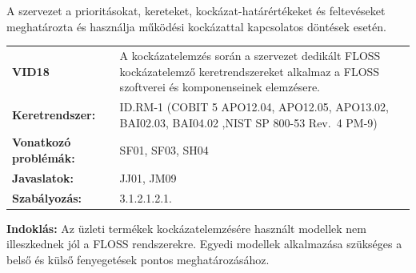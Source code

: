\documentclass[12pt,magyar,a4paper,oneside]{scrreprt}
\begin{document}
A szervezet a prioritásokat, kereteket, kockázat-határértékeket és
feltevéseket meghatározta és használja működési kockázattal kapcsolatos
döntések esetén.

\begin{longtable}[]{@{}ll@{}}
\toprule
\endhead
\begin{minipage}[t]{0.16\columnwidth}\raggedright
\textbf{VID18}\strut
\end{minipage} & \begin{minipage}[t]{0.79\columnwidth}\raggedright
A kockázatelemzés során a szervezet dedikált FLOSS kockázatelemző
keretrendszereket alkalmaz a FLOSS szoftverei és komponenseinek
elemzésere.\strut
\end{minipage}\tabularnewline
\begin{minipage}[t]{0.16\columnwidth}\raggedright
\textbf{Keretrendszer:}\strut
\end{minipage} & \begin{minipage}[t]{0.79\columnwidth}\raggedright
ID.RM-1 (COBIT 5 APO12.04, APO12.05, APO13.02, BAI02.03, BAI04.02 ,NIST
SP 800-53 Rev.~4 PM-9)\strut
\end{minipage}\tabularnewline
\begin{minipage}[t]{0.16\columnwidth}\raggedright
\textbf{Vonatkozó problémák:}\strut
\end{minipage} & \begin{minipage}[t]{0.79\columnwidth}\raggedright
SF01, SF03, SH04\strut
\end{minipage}\tabularnewline
\begin{minipage}[t]{0.16\columnwidth}\raggedright
\textbf{Javaslatok:}\strut
\end{minipage} & \begin{minipage}[t]{0.79\columnwidth}\raggedright
JJ01, JM09\strut
\end{minipage}\tabularnewline
\begin{minipage}[t]{0.16\columnwidth}\raggedright
\textbf{Szabályozás:}\strut
\end{minipage} & \begin{minipage}[t]{0.79\columnwidth}\raggedright
3.1.2.1.2.1.\strut
\end{minipage}\tabularnewline
\bottomrule
\end{longtable}

\textbf{Indoklás: } Az üzleti termékek kockázatelemzésére használt
modellek nem illeszkednek jól a FLOSS rendszerekre. Egyedi modellek
alkalmazása szükséges a belső és külső fenyegetések pontos
meghatározásához.
\end{document}
